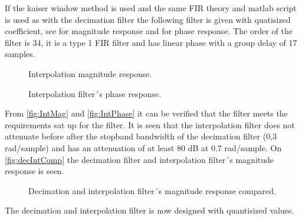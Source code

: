  If the kaiser window method is used and the same FIR theory and matlab script is used as with the decimation filter the following filter is given with quatisized coefficient, see for magnitude response and for phase response. The order of the filter is 34, it is a type 1 FIR filter and has linear phase with a group delay of 17 samples.

\begin{figure}[H]
	\centering
	
	\caption{Interpolation magnitude response.}
	\label{fig:IntMag}
\end{figure}

\begin{figure}[H]
	\centering
	
	\caption{Interpolation filter´s phase response.}
	\label{fig:IntPhase}
\end{figure}

From \autoref{fig:IntMag} and \autoref{fig:IntPhase} it can be verified that the filter meets the requirements sat up for the filter. It is seen that the interpolation filter does not attenuate before after the stopband bandwidth of the decimation filter (0,3 rad/sample) and has an attenuation of at least 80 dB at 0.7 rad/sample. On \autoref{fig:decIntComp} the decimation filter and interpolation filter´s magnitude response is seen.  

\begin{figure}[H]
	\centering
	
	\caption{Decimation and interpolation filter´s magnitude response compared.}
	\label{fig:decIntComp}
\end{figure}

The decimation and interpolation filter is now designed with quantisized values. %